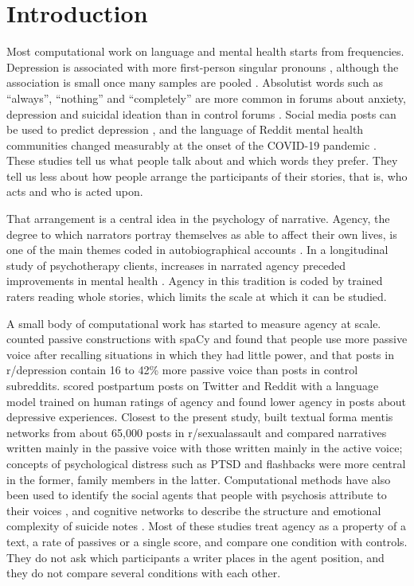 \documentclass[11pt,a4paper]{article}
\begin{document}
\section{Introduction}

Most computational work on language and mental health starts from frequencies. Depression is associated with more first-person singular pronouns \citep{rude2004}, although the association is small once many samples are pooled \citep{tackman2019}. Absolutist words such as ``always'', ``nothing'' and ``completely'' are more common in forums about anxiety, depression and suicidal ideation than in control forums \citep{almosaiwi2018}. Social media posts can be used to predict depression \citep{dechoudhury2013}, and the language of Reddit mental health communities changed measurably at the onset of the COVID-19 pandemic \citep{low2020}. These studies tell us what people talk about and which words they prefer. They tell us less about how people arrange the participants of their stories, that is, who acts and who is acted upon.

That arrangement is a central idea in the psychology of narrative. Agency, the degree to which narrators portray themselves as able to affect their own lives, is one of the main themes coded in autobiographical accounts \citep{mcadams1996}. In a longitudinal study of psychotherapy clients, increases in narrated agency preceded improvements in mental health \citep{adler2012}. Agency in this tradition is coded by trained raters reading whole stories, which limits the scale at which it can be studied.

A small body of computational work has started to measure agency at scale. \citet{simchon2023} counted passive constructions with spaCy and found that people use more passive voice after recalling situations in which they had little power, and that posts in r/depression contain 16 to 42\% more passive voice than posts in control subreddits. \citet{witkowska2026} scored postpartum posts on Twitter and Reddit with a language model trained on human ratings of agency and found lower agency in posts about depressive experiences. Closest to the present study, \citet{abramski2024} built textual forma mentis networks from about 65,000 posts in r/sexualassault and compared narratives written mainly in the passive voice with those written mainly in the active voice; concepts of psychological distress such as PTSD and flashbacks were more central in the former, family members in the latter. Computational methods have also been used to identify the social agents that people with psychosis attribute to their voices \citep{shiel2022}, and cognitive networks to describe the structure and emotional complexity of suicide notes \citep{stella2022suicide}. Most of these studies treat agency as a property of a text, a rate of passives or a single score, and compare one condition with controls. They do not ask which participants a writer places in the agent position, and they do not compare several conditions with each other.
\end{document}
